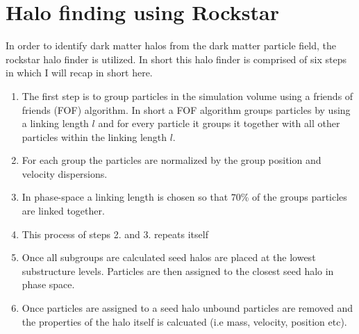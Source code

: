 \section{Halo finding using Rockstar}
In order to identify dark matter halos from the dark matter particle field, the rockstar halo finder\cite{rockstar} is utilized. In short this halo finder is comprised of six steps in which I will recap in short here.
\begin{enumerate}
    \item The first step is to group particles in the simulation volume using a friends of friends (FOF) algorithm. In short a FOF algorithm groups particles by using a linking length $l$ and for every particle it groups it together with all other particles within the linking length $l$.
    \item For each group the particles are normalized by the group position and velocity dispersions.
    \item In phase-space a linking length is chosen so that $70$\% of the groups particles are linked together.
    \item This process of steps 2. and 3. repeats itself
    \item Once all subgroups are calculated seed halos are placed at the lowest substructure levels. Particles are then assigned to the closest seed halo in phase space.
    \item Once particles are assigned to a seed halo unbound particles are removed and the properties of the halo itself is calcuated (i.e mass, velocity, position etc).
\end{enumerate}
